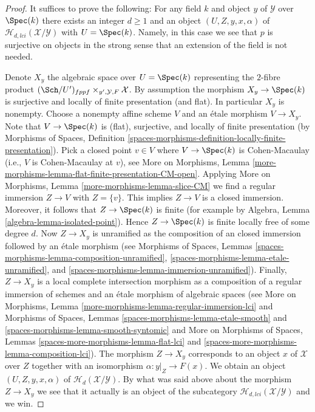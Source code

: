 \begin{proof}
It suffices to prove the following: For any field $k$
and object $y$ of $\mathcal{Y}$ over $\Spec(k)$ there exists
an integer $d \geq 1$ and an object $(U, Z, y, x, \alpha)$ of
$\mathcal{H}_{d, lci}(\mathcal{X}/\mathcal{Y})$ with $U = \Spec(k)$.
Namely, in this case we see that $p$ is surjective on objects in the
strong sense that an extension of the field is not needed.

\medskip\noindent
Denote $X_y$ the algebraic space over $U = \Spec(k)$
representing the $2$-fibre product
$(\Sch/U')_{fppf} \times_{y', \mathcal{Y}, F} \mathcal{X}$.
By assumption the morphism $X_y \to \Spec(k)$ is surjective and
locally of finite presentation (and flat). In particular $X_y$ is
nonempty. Choose a nonempty affine scheme $V$ and an \'etale morphism
$V \to X_y$. Note that $V \to \Spec(k)$ is (flat), surjective,
and locally of finite presentation (by
Morphisms of Spaces,
Definition \ref{spaces-morphisms-definition-locally-finite-presentation}).
Pick a closed point $v \in V$ where $V \to \Spec(k)$ is Cohen-Macaulay
(i.e., $V$ is Cohen-Macaulay at $v$), see
More on Morphisms,
Lemma \ref{more-morphisms-lemma-flat-finite-presentation-CM-open}.
Applying
More on Morphisms,
Lemma \ref{more-morphisms-lemma-slice-CM}
we find a regular immersion $Z \to V$ with $Z = \{v\}$.
This implies $Z \to V$ is a closed immersion. Moreover, it follows that
$Z \to \Spec(k)$ is finite (for example by
Algebra, Lemma \ref{algebra-lemma-isolated-point}).
Hence $Z \to \Spec(k)$ is finite locally free of some degree $d$.
Now $Z \to X_y$ is unramified as the composition
of an closed immersion followed by an \'etale morphism
(see
Morphisms of Spaces, Lemmas \ref{spaces-morphisms-lemma-composition-unramified},
\ref{spaces-morphisms-lemma-etale-unramified}, and
\ref{spaces-morphisms-lemma-immersion-unramified}).
Finally, $Z \to X_y$ is a local complete intersection morphism
as a composition of a regular immersion of schemes and an \'etale
morphism of algebraic spaces (see
More on Morphisms, Lemma \ref{more-morphisms-lemma-regular-immersion-lci}
and
Morphisms of Spaces, Lemmas \ref{spaces-morphisms-lemma-etale-smooth} and
\ref{spaces-morphisms-lemma-smooth-syntomic} and
More on Morphisms of Spaces,
Lemmas \ref{spaces-more-morphisms-lemma-flat-lci} and
\ref{spaces-more-morphisms-lemma-composition-lci}).
The morphism $Z \to X_y$ corresponds to an object $x$ of $\mathcal{X}$
over $Z$ together with an isomorphism $\alpha : y|_Z \to F(x)$.
We obtain an object $(U, Z, y, x, \alpha)$ of
$\mathcal{H}_d(\mathcal{X}/\mathcal{Y})$. By what was said above about
the morphism $Z \to X_y$ we see that it actually is an object of the
subcategory $\mathcal{H}_{d, lci}(\mathcal{X}/\mathcal{Y})$ and we win.
\end{proof}




















